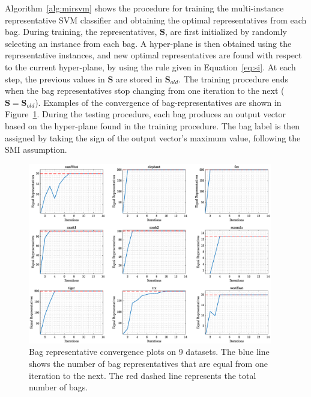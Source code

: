 Algorithm~\ref{alg:mirsvm} shows the procedure for training the multi-instance representative SVM classifier and obtaining the optimal representatives from each bag.  During training, the representatives, $\bm S$, are first initialized by randomly selecting an instance from each bag. A hyper-plane is then obtained using the representative instances, and new optimal representatives are found with respect to the current hyper-plane, by using the rule given in Equation~\eqref{eq:si}. At each step, the previous values in $\bm S$ are stored in $\bm S_{old}$. The training procedure ends when the bag representatives stop changing from one iteration to the next ($\bm S = \bm S_{old}$). Examples of the convergence of bag-representatives are shown in Figure~\ref{fig:convegence}. During the testing procedure, each bag produces an output vector based on the hyper-plane found in the training procedure. The bag label is then assigned by taking the sign of the output vector's maximum value, following the SMI assumption. 

\begin{figure}
\centering
\label{fig:convegence}
\includegraphics[width=0.95\textwidth]{convergence.eps} 
\caption{Bag representative convergence plots on 9 datasets. The blue line shows the number of bag representatives that are equal from one iteration to the next. The red dashed line represents the total number of bags.}
\end{figure}


